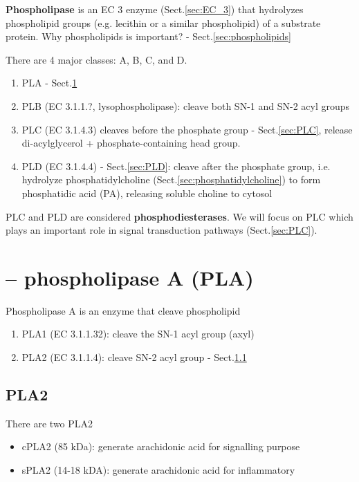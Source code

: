 {\bf Phospholipase} is an EC 3 enzyme (Sect.\ref{sec:EC_3}) that hydrolyzes
phospholipid groups (e.g. lecithin or a similar phospholipid) of a substrate
protein. Why phospholipids is important? - Sect.\ref{sec:phospholipids}

There are 4 major classes: A, B, C, and D. 
\begin{enumerate}
  \item PLA - Sect.\ref{sec:PLA}
  
  \item PLB (EC 3.1.1.?, lysophospholipase): cleave both SN-1 and SN-2 acyl
  groups
        
  \item PLC (EC 3.1.4.3) cleaves before the phosphate
  group - Sect.\ref{sec:PLC}, release di-acylglycerol + phosphate-containing
  head group.
  
\item PLD (EC 3.1.4.4) - Sect.\ref{sec:PLD}: cleave after the phosphate group,
i.e. hydrolyze phosphatidylcholine (Sect.\ref{sec:phosphatidylcholine}) to form
phosphatidic acid (PA), releasing soluble choline to cytosol 

\end{enumerate}


PLC and PLD are considered {\bf phosphodiesterases}.
We will focus on PLC which plays an important role in signal transduction
pathways (Sect.\ref{sec:PLC}).

\section{-- phospholipase A (PLA)}
\label{sec:PLA}
\label{sec:phospholipase-A}

Phospholipase A is an enzyme that cleave phospholipid
\begin{enumerate}

   \item PLA1 (EC 3.1.1.32): cleave the SN-1 acyl group (axyl)

   \item PLA2 (EC 3.1.1.4): cleave SN-2 acyl group - Sect.\ref{sec:PLA2}
\end{enumerate}

\subsection{PLA2}
\label{sec:PLA2}

There are two PLA2
\begin{itemize}
  \item cPLA2 (85 kDa): generate arachidonic acid for signalling purpose
  
  \item sPLA2 (14-18 kDA): generate arachidonic acid for inflammatory
\end{itemize}

